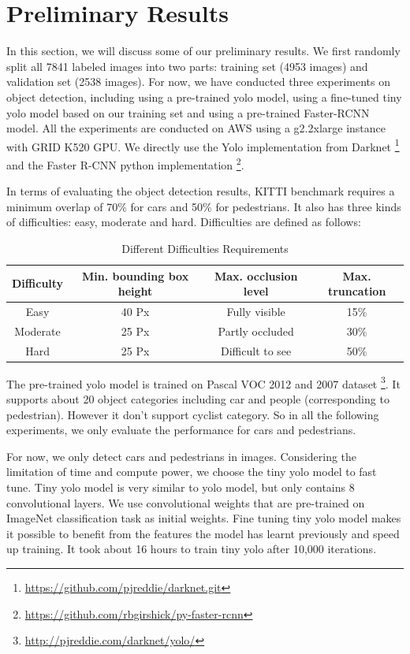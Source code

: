 \section{Preliminary Results}

In this section, we will discuss some of our preliminary results. 
We first randomly split all 7841 labeled images into two parts: 
training set (4953 images) and validation set (2538 images). 
For now, we have conducted three experiments on object detection, including using a pre-trained yolo model, using a fine-tuned tiny yolo model based on our training set and using a pre-trained Faster-RCNN model. All the experiments are conducted on AWS using a g2.2xlarge instance with GRID K520 GPU. We directly use the Yolo implementation from Darknet \footnote{\url{https://github.com/pjreddie/darknet.git}} and the Faster R-CNN python implementation \footnote{\url{https://github.com/rbgirshick/py-faster-rcnn}}.

In terms of evaluating the object detection results, KITTI benchmark requires a minimum overlap of 70\% for cars and 50\% for pedestrians. It also has three kinds of difficulties: easy, moderate and hard. Difficulties are defined as follows:

\begin{table}[h!]
\centering
\begin{tabular}{ c | c | c | c }
\hline
Difficulty & Min. bounding box height & Max. occlusion level & Max. truncation \\
\hline \hline
Easy & 40 Px & Fully visible & 15\% \\
Moderate & 25 Px & Partly occluded & 30\% \\
Hard & 25 Px & Difficult to see & 50\% \\
\hline
\end{tabular}
\caption{Different Difficulties Requirements}
\end{table}

The pre-trained yolo model is trained on Pascal VOC 2012 and 2007 dataset \footnote{\url{http://pjreddie.com/darknet/yolo/}}. It supports about 20 object categories including car and people (corresponding to pedestrian). However it don't support cyclist category. So in all the following experiments, we only evaluate the performance for cars and pedestrians.

For now, we only detect cars and pedestrians in images. Considering the limitation of time and compute power, we choose the tiny yolo model to fast tune. Tiny yolo model is very similar to yolo model, but only contains 8 convolutional layers. We use convolutional weights that are pre-trained on ImageNet classification task as initial weights. Fine tuning tiny yolo model makes it possible to benefit from the features the model has learnt previously and speed up training. It took about 16 hours to train tiny yolo after 10,000 iterations.


